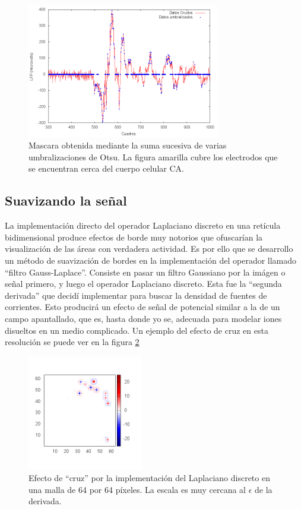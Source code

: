 \documentclass{article}
\begin{document}
\begin{figure}[h]
  \centering
  \includegraphics[width=0.75\textwidth]{ComparaUmbral.png}
  \caption{Mascara obtenida mediante la suma sucesiva de varias
    umbralizaciones de Otsu. La figura amarilla cubre los electrodos
    que se encuentran cerca del cuerpo celular CA.} \label{umbralc}
\end{figure}  


\subsection{Suavizando la señal}


La implementación directo del operador
Laplaciano discreto en una retícula bidimensional produce
efectos de borde muy notorios que ofuscarían la visualización
de las áreas con verdadera actividad. Es por ello que se
desarrollo un método de suavización de bordes en la  implementación
del operador llamado ``filtro Gauss-Laplace''. Consiste en pasar
un filtro Gaussiano por la imágen o señal primero, y luego el 
operador Laplaciano discreto. Esta fue la ``segunda derivada'' que
decidí implementar para buscar la densidad de fuentes de corrientes.
Esto producirá un efecto de señal de potencial similar a 
la de un campo apantallado, que es, hasta donde yo se,
 adecuada para modelar iones disueltos en un  medio
 complicado. Un ejemplo del efecto de cruz en esta resolución
 se puede ver en la figura \ref{LaplacianEfect}

\begin{figure}[h]
  \centering
  \includegraphics[width=0.45\textwidth]{EjemploLaplacian01.png}
  \caption{Efecto de ``cruz'' por la implementación del Laplaciano discreto
    en una malla de 64 por 64 píxeles. La escala es muy cercana al
  $\epsilon$ de la derivada. }\label{LaplacianEfect}
\end{figure}  
\end{document}
